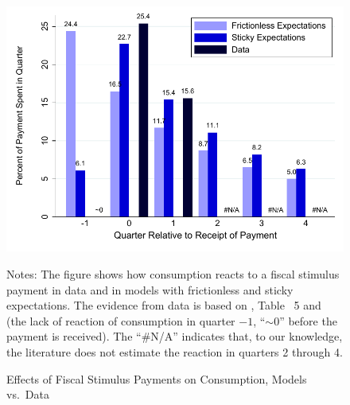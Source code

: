   \begin{figure}
    \centering
    \caption{Effects of Fiscal Stimulus Payments on Consumption, Models vs.\ Data}
    \label{parker}
    { \includegraphics[width=1.0\textwidth]{./Figures/parkerExperiment}}

    \begin{flushleft}
      \footnotesize Notes: The figure shows how consumption reacts to a fiscal stimulus payment in data and in models with frictionless and sticky expectations. The evidence from data is based on \cite{psjmMPC2008}, Table ~5 and \cite{brodaParker} (the lack of reaction of consumption in quarter $-1$, ``$\sim0$'' before the payment is received). The ``\#N/A'' indicates that, to our knowledge, the literature does not estimate the reaction in quarters 2 through 4.
      \normalsize
    \end{flushleft}
  \end{figure}


